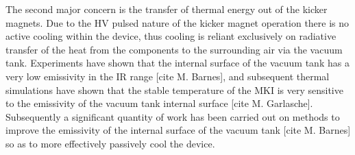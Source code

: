 The second major concern is the transfer of thermal energy out of the kicker magnets. Due to the HV pulsed nature of the kicker magnet operation there is no active cooling within the device, thus cooling is reliant exclusively on radiative transfer of the heat from the components to the surrounding air via the vacuum tank. Experiments have shown that the internal surface of the vacuum tank has a very low emissivity in the IR range [cite M. Barnes], and subsequent thermal simulations have shown that the stable temperature of the MKI is very sensitive to the emissivity of the vacuum tank internal surface [cite M. Garlasche]. Subsequently a significant quantity of work has been carried out on methods to improve the emissivity of the internal surface of the vacuum tank [cite M. Barnes] so as to more effectively passively cool the device.